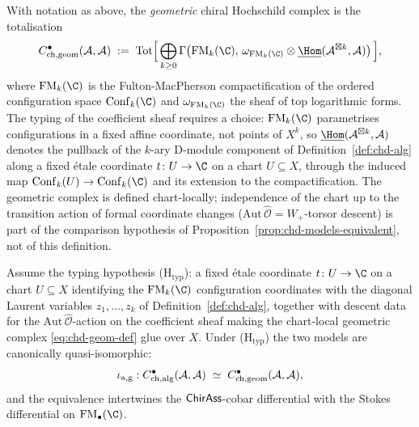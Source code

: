 \begin{definition}%
\label{def:chd-geom}%
%
With notation as above, the \emph{geometric} chiral Hochschild complex
is the totalisation
\begin{equation}\label{eq:chd-geom-def}
 C^\bullet_{\mathrm{ch,geom}}(\cA, \cA) \;:=\;
 \operatorname{Tot} \Bigl[\,
 \bigoplus_{k \ge 0}
 \Gamma\bigl(\FM_k(\C),\,
 \omega_{\FM_k(\C)}\otimes
 \underline{\Hom}(\cA^{\boxtimes k}, \cA)\bigr)\,\Bigr],
\end{equation}
where $\FM_k(\C)$ is the Fulton-MacPherson compactification of the
ordered configuration space $\Conf_k(\C)$ and $\omega_{\FM_k(\C)}$ the
sheaf of top logarithmic forms. The typing of the coefficient sheaf
requires a choice: $\FM_k(\C)$ parametrises configurations in a fixed
affine coordinate, not points of $X^k$, so
$\underline{\Hom}(\cA^{\boxtimes k}, \cA)$ denotes the pullback of the
$k$-ary D-module component of Definition~\ref{def:chd-alg} along a
fixed \'etale coordinate $t\colon U \to \C$ on a chart $U \subseteq X$,
through the induced map $\Conf_k(U) \to \Conf_k(\C)$ and its extension
to the compactification. The geometric complex is defined
chart-locally; independence of the chart up to the transition action
of formal coordinate changes ($\mathrm{Aut}\,\hat{\mathcal O} = W_+$-torsor
descent) is part of the comparison hypothesis of
Proposition~\ref{prop:chd-models-equivalent}, not of this definition.
\end{definition}

\begin{proposition}%
\label{prop:chd-models-equivalent}%
%
Assume the typing hypothesis \textup{(H$_{\mathrm{typ}}$)}: a fixed
\'etale coordinate $t\colon U \to \C$ on a chart $U \subseteq X$
identifying the $\FM_k(\C)$ configuration coordinates with the
diagonal Laurent variables $z_1,\ldots,z_k$ of
Definition~\ref{def:chd-alg}, together with descent data for the
$\mathrm{Aut}\,\hat{\mathcal O}$-action on the coefficient sheaf
making the chart-local geometric complex
\eqref{eq:chd-geom-def} glue over $X$. Under
\textup{(H$_{\mathrm{typ}}$)} the two models are canonically
quasi-isomorphic:
\[
 \iota_{\mathrm{a,g}}:
 C^\bullet_{\mathrm{ch,alg}}(\mathcal{A}, \mathcal{A}) \;\simeq\;
 C^\bullet_{\mathrm{ch,geom}}(\mathcal{A}, \mathcal{A}),
\]
and the equivalence intertwines the $\mathsf{ChirAss}$-cobar differential with
the Stokes differential on $\FM_\bullet(\C)$.
\end{proposition}

